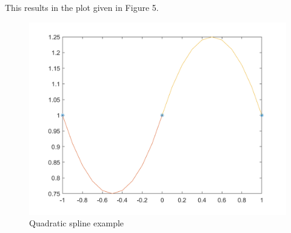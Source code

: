 \documentclass [titlepage,12pt,letter] {article}
\begin{document}
\noindent
This results in the plot given in Figure 5.

\begin{figure} 
  \centering
  \includegraphics[scale=0.3]{lect14QuadSpline}
  \caption{Quadratic spline example}
  \label{fig:QuadSpline}
\end{figure}
\end{document}
